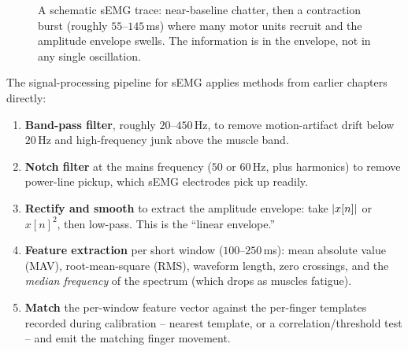 \begin{figure}[H]
\centering
{}
\caption{A schematic sEMG trace: near-baseline chatter, then a contraction burst
(roughly $55$--$145$\,ms) where many motor units recruit and the amplitude envelope
swells. The information is in the envelope, not in any single oscillation.}
\label{ch37:fig-emg-trace}
\end{figure}

The signal-processing pipeline for sEMG applies methods from earlier chapters
directly:

\begin{enumerate}
\item \textbf{Band-pass filter}, roughly $20$--$450$\,Hz, to remove motion-artifact
drift below $20$\,Hz and high-frequency junk above the muscle band.
\item \textbf{Notch filter} at the mains frequency ($50$ or $60$\,Hz, plus harmonics)
to remove power-line pickup, which sEMG electrodes pick up readily.
\item \textbf{Rectify and smooth} to extract the amplitude envelope: take $\lvert x[n]\rvert$
or $x[n]^2$, then low-pass. This is the ``linear envelope.''
\item \textbf{Feature extraction} per short window ($100$--$250$\,ms): mean absolute
value (MAV), root-mean-square (RMS), waveform length, zero crossings, and the
\emph{median frequency} of the spectrum (which drops as muscles fatigue).
\item \textbf{Match} the per-window feature vector against the per-finger templates
recorded during calibration -- nearest template, or a correlation/threshold test --
and emit the matching finger movement.
\end{enumerate}

